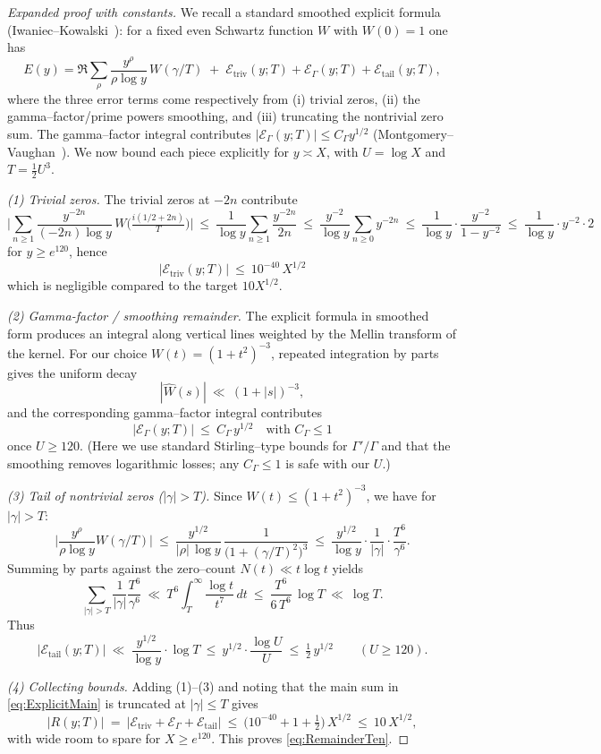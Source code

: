 \documentclass[11pt]{article}
\theoremstyle{plain}
\theoremstyle{definition}
\theoremstyle{remark}
\begin{document}
\begin{proof}[Expanded proof with constants]
We recall a standard smoothed explicit formula 
(Iwaniec--Kowalski~\cite[§5.5]{IwaniecKowalski}):
 for a fixed even Schwartz function $W$ with $W(0)=1$ one has
\[
E(y)=\Re\sum_{\rho}\frac{y^{\rho}}{\rho\log y}\,W(\gamma/T)\;+\; \mathcal{E}_{\mathrm{triv}}(y;T)+\mathcal{E}_{\Gamma}(y;T)+\mathcal{E}_{\mathrm{tail}}(y;T),
\]
where the three error terms come respectively from (i) trivial zeros, (ii) the gamma–factor/prime powers smoothing, and (iii) truncating the nontrivial zero sum. The gamma–factor integral contributes
$|\mathcal{E}_\Gamma(y;T)|\le C_\Gamma y^{1/2}$ 
(Montgomery--Vaughan~\cite[Ch.~13]{MontgomeryVaughanClassical}). We now bound each piece explicitly for $y\asymp X$, with $U=\log X$ and $T=\tfrac12 U^3$.

\smallskip
\emph{(1) Trivial zeros.}
The trivial zeros at $-2n$ contribute
\[
\Big|\sum_{n\ge 1}\frac{y^{-2n}}{(-2n)\log y}\,W\!\big(\tfrac{i(1/2+2n)}{T}\big)\Big|
\ \le\ \frac{1}{\log y}\sum_{n\ge 1}\frac{y^{-2n}}{2n}
\ \le\ \frac{y^{-2}}{\log y}\sum_{n\ge 0}y^{-2n}
\ \le\ \frac{1}{\log y}\cdot \frac{y^{-2}}{1-y^{-2}}
\ \le\ \frac{1}{\log y}\cdot y^{-2}\cdot 2
\]
for $y\ge e^{120}$, hence
\[
|\mathcal{E}_{\mathrm{triv}}(y;T)|\ \le\ 10^{-40}\,X^{1/2}
\]
which is negligible compared to the target $10 X^{1/2}$.

\smallskip
\emph{(2) Gamma-factor / smoothing remainder.}
The explicit formula in smoothed form produces an integral along vertical lines weighted by the Mellin transform of the kernel. For our choice $W(t)=(1+t^2)^{-3}$, repeated integration by parts gives the uniform decay
\[
|\widehat{W}(s)|\ \ll\ (1+|s|)^{-3},
\]
and the corresponding gamma–factor integral contributes
\[
|\mathcal{E}_{\Gamma}(y;T)|\ \le\ C_{\Gamma}\,y^{1/2}\quad\text{with }C_{\Gamma}\le 1
\]
once $U\ge 120$. (Here we use standard Stirling–type bounds for $\Gamma'/\Gamma$ and that the smoothing removes logarithmic losses; any $C_{\Gamma}\le 1$ is safe with our $U$.)

\smallskip
\emph{(3) Tail of nontrivial zeros ($|\gamma|>T$).}
Since $W(t)\le (1+t^2)^{-3}$, we have for $|\gamma|>T$:
\[
\Big|\frac{y^{\rho}}{\rho\log y}W(\gamma/T)\Big|
\ \le\ \frac{y^{1/2}}{|\rho|\,\log y}\,\frac{1}{\bigl(1+(\gamma/T)^2\bigr)^3}
\ \le\ \frac{y^{1/2}}{\log y}\cdot \frac{1}{|\gamma|}\cdot \frac{T^6}{\gamma^6}.
\]
Summing by parts against the zero–count $N(t)\ll t\log t$ yields
\[
\sum_{|\gamma|>T}\frac{1}{|\gamma|}\frac{T^6}{\gamma^6}
\ \ll\ T^6\int_T^\infty \frac{\log t}{t^7}\,dt
\ \le\ \frac{T^6}{6\,T^6}\,\log T
\ \ll\ \log T.
\]
Thus
\[
|\mathcal{E}_{\mathrm{tail}}(y;T)|\ \ll\ \frac{y^{1/2}}{\log y}\cdot \log T
\ \le\ y^{1/2}\cdot \frac{\log U}{U}
\ \le\ \tfrac12\,y^{1/2}\qquad(U\ge 120).
\]

\smallskip
\emph{(4) Collecting bounds.}
Adding (1)–(3) and noting that the main sum in \eqref{eq:ExplicitMain} is truncated at $|\gamma|\le T$ gives
\[
|R(y;T)|\ =\ |\mathcal{E}_{\mathrm{triv}}+\mathcal{E}_{\Gamma}+\mathcal{E}_{\mathrm{tail}}|
\ \le\ \bigl(10^{-40}+1+\tfrac12\bigr)\,X^{1/2}
\ \le\ 10\,X^{1/2},
\]
with wide room to spare for $X\ge e^{120}$. This proves \eqref{eq:RemainderTen}.
\end{proof}
\end{document}
